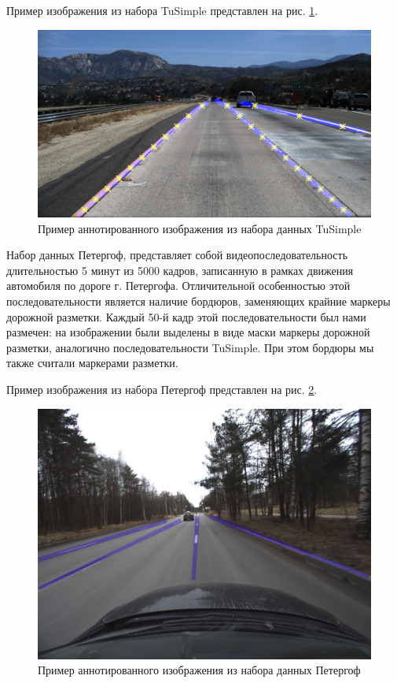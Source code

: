 \documentclass[aps,%
14pt,%
final,%
oneside,
onecolumn,%
musixtex, %
superscriptaddress,%
centertags]{extarticle} %
\begin{document}
Пример изображения из набора TuSimple  представлен на рис. \ref{fig:ex_tusimple}.

\begin{figure}[htp]
\centering
\includegraphics[width=\textwidth]{ex_tusimple.png}
\caption{Пример аннотированного изображения из набора данных TuSimple}
\label{fig:ex_tusimple}
\end{figure}

Набор данных Петергоф, представляет собой видеопоследовательность длительностью 5 минут из 5000 кадров, записанную в рамках движения автомобиля по дороге г. Петергофа. Отличительной особенностью этой последовательности является наличие бордюров, заменяющих крайние маркеры дорожной разметки. Каждый 50-й кадр этой последовательности был нами размечен: на изображении были выделены в виде маски маркеры дорожной разметки, аналогично последовательности TuSimple. При этом бордюры мы также считали маркерами разметки.

Пример изображения из набора Петергоф  представлен на рис. \ref{fig:ex_mm}.

\begin{figure}[htp]
\centering
\includegraphics[scale=0.2]{ex_mm.jpg}
\caption{Пример аннотированного изображения из набора данных Петергоф}
\label{fig:ex_mm}
\end{figure}
\end{document}
